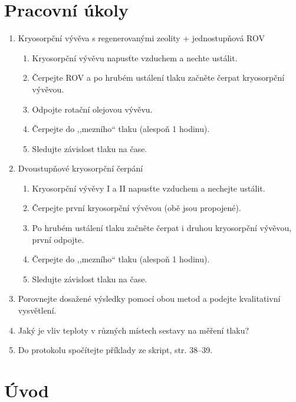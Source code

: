 \documentclass[english]{article}
\begin{document}


\setlength{\parindent}{0.5cm}

\section{Pracovní úkoly}

\begin{enumerate}

\item{Kryosorpční vývěva s regenerovanými zeolity + jednostupňová ROV}
\begin{enumerate}
	  \item Kryosorpční vývěvu napusťte vzduchem a nechte ustálit.
	  \item Čerpejte ROV a po hrubém ustálení tlaku začněte čerpat kryosorpční vývěvou.
	  \item Odpojte rotační olejovou vývěvu.
	  \item Čerpejte do ,,mezního`` tlaku (alespoň 1 hodinu).
	  \item Sledujte závislost tlaku na čase. 
\end{enumerate}

\item{Dvoustupňové kryosorpční čerpání}
\begin{enumerate}
	\item Kryosorpční vývěvy I a II napusťte vzduchem a nechejte ustálit. 
	\item Čerpejte první kryosorpční vývěvou (obě jsou propojené).
	\item Po hrubém ustálení tlaku začněte čerpat i druhou kryosorpční vývěvou, první odpojte.
	\item Čerpejte do ,,mezního`` tlaku (alespoň 1 hodinu).
	\item Sledujte závislost tlaku na čase.
\end{enumerate}

	\item Porovnejte dosažené výsledky pomocí obou metod a podejte kvalitativní vysvětlení.
	\item Jaký je vliv teploty v různých místech sestavy na měření tlaku?
	\item Do protokolu spočítejte příklady ze skript, str. 38--39.
\end{enumerate}

\section{Úvod}
\end{document}
